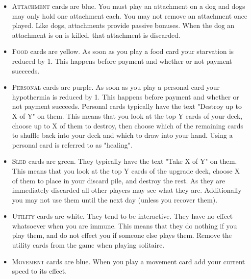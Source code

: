 \documentclass{article}
\begin{document}
\begin{multicols}{3}
\begin{itemize}
        \item \textsc{Attachment} cards are blue. You must play an attachment on a dog
            and dogs may only hold one attachment each. You may not remove an
            attachment once played. Like dogs, attachments provide passive
            bonuses. When the dog an attachment is on is killed, that attachment
            is discarded.

        \item \textsc{Food} cards are yellow. As soon as you play a food card your
            starvation is reduced by 1. This happens before payment and whether
            or not payment succeeds.

        \item \textsc{Personal} cards are purple. As soon as you play a personal card
            your hypothermia is reduced by 1. This happens before payment and
            whether or not payment succeeds. Personal cards typically have the
            text "Destroy up to X of Y" on them. This means that you look at the
            top Y cards of your deck, choose up to X of them to destroy, then
            choose which of the remaining cards to shuffle back into your deck
            and which to draw into your hand. Using a personal card is referred
            to as "healing".

        \item \textsc{Sled} cards are green. They typically have the text "Take X of Y"
            on them. This means that you look at the top Y cards of the upgrade
            deck, choose X of them to place in your discard pile, and destroy
            the rest. As they are immediately discarded all other players may
            see what they are. Additionally you may not use them until the next
            day (unless you recover them).

        \item \textsc{Utility} cards are white. They tend to be interactive. They have no
            effect whatsoever when you are immune. This means that they do
            nothing if you play them, and do not effect you if someone else
            plays them. Remove the utility cards from the game when playing
            solitaire.

        \item \textsc{Movement} cards are blue. When you play a movement card add your
            current speed to its effect.
    \end{itemize}

\end{multicols}
\end{document}
